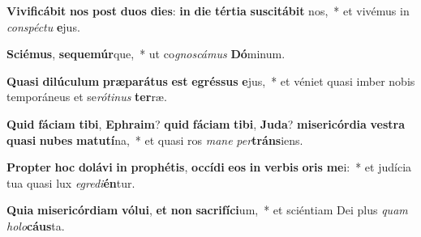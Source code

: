\item \textbf{Vi}\textbf{vi}\textbf{fi}\textbf{cá}\textbf{bit} \textbf{nos} \textbf{post} \textbf{du}\textbf{os} \textbf{di}\textbf{es}: \textbf{in} \textbf{di}\textbf{e} \textbf{tér}\textbf{ti}\textbf{a} \textbf{su}\textbf{sci}\textbf{tá}\textbf{bit} nos,~* et vivémus in \textit{con}\textit{spéc}\textit{tu} \textbf{e}jus.
\item \textbf{Sci}\textbf{é}\textbf{mus}, \textbf{se}\textbf{que}\textbf{múr}que,~* ut co\textit{gnos}\textit{cá}\textit{mus} \textbf{Dó}minum.
\item \textbf{Qua}\textbf{si} \textbf{di}\textbf{lú}\textbf{cu}\textbf{lum} \textbf{præ}\textbf{pa}\textbf{rá}\textbf{tus} \textbf{est} \textbf{e}\textbf{grés}\textbf{sus} \textbf{e}jus,~* et véniet quasi imber nobis temporáneus et se\textit{ró}\textit{ti}\textit{nus} \textbf{ter}ræ.
\item \textbf{Quid} \textbf{fá}\textbf{ci}\textbf{am} \textbf{ti}\textbf{bi}, \textbf{E}\textbf{phra}\textbf{im}? \textbf{quid} \textbf{fá}\textbf{ci}\textbf{am} \textbf{ti}\textbf{bi}, \textbf{Ju}\textbf{da}? \textbf{mi}\textbf{se}\textbf{ri}\textbf{cór}\textbf{di}\textbf{a} \textbf{ves}\textbf{tra} \textbf{qua}\textbf{si} \textbf{nu}\textbf{bes} \textbf{ma}\textbf{tu}\textbf{tí}na,~* et quasi ros \textit{ma}\textit{ne} \textit{per}\textbf{tráns}iens.
\item \textbf{Prop}\textbf{ter} \textbf{hoc} \textbf{do}\textbf{lá}\textbf{vi} \textbf{in} \textbf{pro}\textbf{phé}\textbf{tis}, \textbf{oc}\textbf{cí}\textbf{di} \textbf{e}\textbf{os} \textbf{in} \textbf{ver}\textbf{bis} \textbf{o}\textbf{ris} \textbf{me}i:~* et judícia tua quasi lux \textit{e}\textit{gre}\textit{di}\textbf{én}tur.
\item \textbf{Qui}\textbf{a} \textbf{mi}\textbf{se}\textbf{ri}\textbf{cór}\textbf{di}\textbf{am} \textbf{vó}\textbf{lu}\textbf{i}, \textbf{et} \textbf{non} \textbf{sa}\textbf{cri}\textbf{fí}\textbf{ci}um,~* et sciéntiam Dei plus \textit{quam} \textit{ho}\textit{lo}\textbf{cáus}ta.
